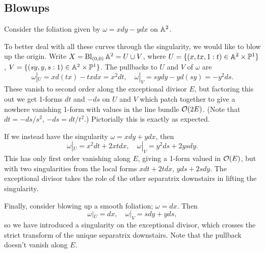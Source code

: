 
\subsection{Blowups}

\begin{example}
    Consider the foliation given by $\omega=xdy-ydx$ on $\mathbb{A}^2$. %

    To better deal with all these curves through the singularity, we would like
    to blow up the origin. Write $X=\operatorname{Bl}_{(0,0)}\mathbb{A}^2=U\cup V$, where
    $U=\{(x,tx,1:t)\in\mathbb{A}^2\times\mathbb{P}^1\}$, $V=\{(sy,y,s:1)\in\mathbb{A}^2\times\mathbb{P}^1\}$.
    The pullbacks to $U$ and $V$ of $\omega$ are
    \begin{equation*}
        \omega|_U = xd(tx)-txdx = x^2dt, \quad
        \omega|_V = sydy - yd(sy) = -y^2ds.
    \end{equation*}
    These vanish to second order along the exceptional divisor $E$, but
    factoring this out we get 1-forms $dt$ and $-ds$ on $U$ and $V$ which patch
    together to give a nowhere vanishing 1-form with values in the line bundle
    $\mathcal{O}(2E)$. (Note that $dt=-ds/s^2$, $-ds=dt/t^2$.) Pictorially this
    is exactly as expected. %
\end{example}

\begin{example}
    If we instead have the singularity $\omega=xdy+ydx$, then
    \begin{equation*}
        \omega|_U = x^2dt + 2xtdx, \quad
        \omega|_V = y^2ds+2ysdy.
    \end{equation*}
    This has only first order vanishing along $E$, giving a 1-form valued in
    $\mathcal{O}(E)$, but with two singularities from the local forms $xdt+2tdx$,
    $yds+2sdy$. The exceptional divisor takes the role of the other separatrix
    downstairs in lifting the singularity.
\end{example}

\begin{example}\label{ex:smooth blowup}
    Finally, consider blowing up a smooth foliation; $\omega=dx$. Then
    \begin{equation*}
        \omega|_U = dx, \quad \omega|_V = sdy+yds,
    \end{equation*}
    so we have introduced a singularity on the exceptional divisor, which
    crosses the strict transform of the unique separatrix downstairs. Note that
    the pullback doesn't vanish along $E$.
\end{example}

